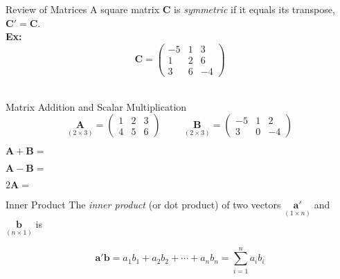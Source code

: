 \documentclass[11pt]{beamer}
\begin{document}
\begin{frame}{Review of Matrices}
A square matrix $\bm{C}$ is \emph{symmetric} if it equals its transpose, $\bm{C'} = \bm{C}$.\\ 
\vspace{12pt}
\textbf{Ex:}
\[
\bm{C} = 
\begin{pmatrix}
-5 & 1 & 3\\
1 & 2 & 6\\
3 & 6 & -4
\end{pmatrix}
\]\\
\end{frame}

\begin{frame}{Matrix Addition and Scalar Multiplication}
\[
\underset{(2 \times 3)}{\bm{A}} = 
\begin{pmatrix}
1 & 2 & 3\\
4 & 5 & 6
\end{pmatrix}
\hspace{1cm}
\underset{(2 \times 3)}{\bm{B}} = 
\begin{pmatrix}
-5 & 1 & 2\\
3 & 0 & -4
\end{pmatrix}
\]
\vspace{1cm}

$\bm{A} + \bm{B} =$\\
\vspace{1cm}

$\bm{A} - \bm{B} =$\\ 
\vspace{1cm}

$2 \bm{A} =$\\
\vspace{1cm}
\end{frame}

\begin{frame}{Inner Product}
\vspace{-2cm}
The \emph{inner product} (or dot product) of two vectors $ \underset{(1 \times n)}{\bm{a'}}$ and $\underset{(n \times 1)}{\bm{b}}$ is

$$ \bm{a'}\bm{b} = a_1 b_1 + a_2 b_2 + \cdots + a_n b_n = \sum_{i=1}^n a_i b_i$$
\end{frame}
\end{document}
